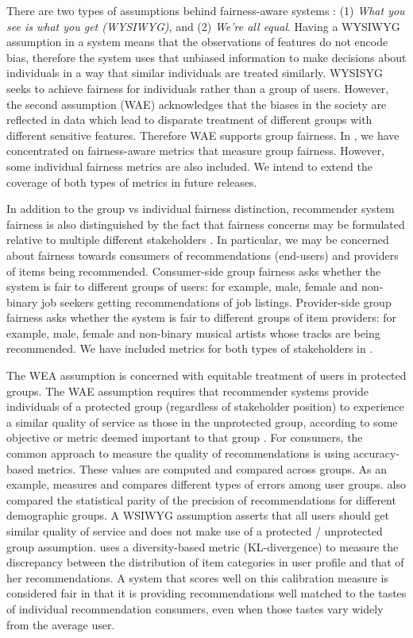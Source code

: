 There are two types of assumptions behind fairness-aware systems \citet{friedler-impossibility-2021}: (1) \textit{What you see is what you get (WYSIWYG)}, and (2) \textit{We're all equal}. Having a WYSIWYG assumption in a system means that the observations of features do not encode bias, therefore the system uses that unbiased information to make decisions about individuals in a way that similar individuals are treated similarly. WYSISYG seeks to achieve fairness for individuals rather than a group of users. However, the second assumption (WAE) acknowledges that the biases in the society are reflected in data which lead to disparate treatment of different groups with different sensitive features. Therefore WAE supports group fairness. In \libauto{}, we have concentrated on fairness-aware metrics that measure group fairness. However, some individual fairness metrics are also included. We intend to extend the coverage of both types of metrics in future releases.

In addition to the group vs individual fairness distinction, recommender system fairness is also distinguished by the fact that fairness concerns may be formulated relative to multiple different stakeholders \cite{burke2017multisided,abdollahpouri2020multistakeholder}. In particular, we may be concerned about fairness towards consumers of recommendations (end-users) and providers of items being recommended. Consumer-side group fairness asks whether the system is fair to different groups of users: for example, male, female and non-binary job seekers getting recommendations of job listings. Provider-side group fairness asks whether the system is fair to different groups of item providers: for example, male, female and non-binary musical artists whose tracks are being recommended. We have included metrics for both types of stakeholders in \libauto{}.

The WEA assumption is concerned with equitable treatment of users in protected groups. The WAE assumption requires that recommender systems provide individuals of a protected group (regardless of stakeholder position) to experience a similar quality of service as those in the unprotected group, according to some objective or metric deemed important to that group \cite{ekstrand2018all,ekstrand2021exploring,steck2018calibrated,yao2017beyond}. For consumers, the common approach to measure the quality of recommendations is using accuracy-based metrics. These values are computed and compared across groups. As an example, \cite{yao2017beyond} measures and compares different types of errors among user groups. \cite{burke2018balanced} also compared the statistical parity of the precision of recommendations for different demographic groups. A WSIWYG assumption asserts that all users should get similar quality of service and does not make use of a protected / unprotected group assumption. \cite{steck2018calibrated} uses a diversity-based metric (KL-divergence) to measure the discrepancy between the distribution of item categories in user profile and that of her recommendations. A system that scores well on this calibration measure is considered fair in that it is providing recommendations well matched to the tastes of individual recommendation consumers, even when those tastes vary widely from the average user.

